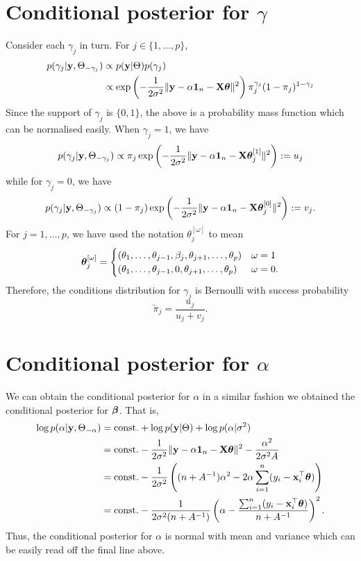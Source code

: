\section{Conditional posterior for $\gamma$}

Consider each $\gamma_j$ in turn. For $j\in\{1,\dots,p\}$,
\begin{align*}
  p(\gamma_j|{\mathbf y},\Theta_{-\gamma_j}) 
  &\propto p({\mathbf y}|\Theta)p(\gamma_j) \\
  &\propto \exp\left( - \frac{1}{2\sigma^2} \Vert {\mathbf y} - \alpha {\mathbf 1}_n - {\mathbf X}{\bm\theta} \Vert^2 \right)
  \pi_j^{\gamma_j}(1-\pi_j)^{1-\gamma_j}
\end{align*}
Since the support of $\gamma_j$ is $\{0,1\}$, the above is a probability mass function which can be normalised easily.
When $\gamma_j=1$, we have 
\[
  p(\gamma_j|{\mathbf y},\Theta_{-\gamma_j}) 
  \propto \pi_j \exp\left( - \frac{1}{2\sigma^2} \Vert {\mathbf y} - \alpha {\mathbf 1}_n - {\mathbf X}{\bm\theta}_j^{[1]} \Vert^2 \right) := u_j
\]
while for $\gamma_j=0$, we have
\[
  p(\gamma_j|{\mathbf y},\Theta_{-\gamma_j}) \propto (1-\pi_j) \exp\left( - \frac{1}{2\sigma^2} \Vert {\mathbf y} - \alpha {\mathbf 1}_n - {\mathbf X}{\bm\theta}_j^{[0]} \Vert^2 \right) := v_j.
\]
For $j=1,\dots,p$, we have used the notation $\theta_j^{[\omega]}$ to mean
\[
  {\bm\theta}_j^{[\omega]} = 
  \begin{cases}
    (\theta_1,\dots,\theta_{j-1},\beta_j,\theta_{j+1},\dots,\theta_p) &\omega = 1 \\
    (\theta_1,\dots,\theta_{j-1},0,\theta_{j+1},\dots,\theta_p) &\omega = 0.
  \end{cases}
\]
Therefore, the conditions distribution for $\gamma_j$ is Bernoulli with success probability 
\[
  \tilde \pi_j = \frac{u_j}{u_j + v_j}.
\]

\section{Conditional posterior for $\alpha$}

We can obtain the conditional posterior for $\alpha$ in a similar fashion we obtained the conditional posterior for ${\bm\beta}$. 
That is,
\begin{align*}
  \log p(\alpha|{\mathbf y},\Theta_{-\alpha}) 
  &= \text{const.}\hspace{0.01em} + \log p({\mathbf y}|\Theta) + \log p(\alpha|\sigma^2) \\
  &= \text{const.}\hspace{0.01em} - \frac{1}{2\sigma^2} \Vert {\mathbf y} - \alpha {\mathbf 1}_n - {\mathbf X}{\bm\theta} \Vert^2  
  - \frac{\alpha^2}{2\sigma^2A} \\
  &= \text{const.}\hspace{0.01em} - \frac{1}{2\sigma^2} \left( (n+A^{-1})\alpha^2 - 2\alpha\sum_{i=1}^n(y_i - {\mathbf x}_i^\top{\bm\theta}) \right) \\
  &= \text{const.}\hspace{0.01em} - \frac{1}{2\sigma^2(n+A^{-1})} \left( \alpha - \frac{\sum_{i=1}^n(y_i - {\mathbf x}_i^\top{\bm\theta})}{n+A^{-1}}  \right)^2.
\end{align*}
Thus, the conditional posterior for $\alpha$ is normal with mean and variance which can be easily read off the final line above.

